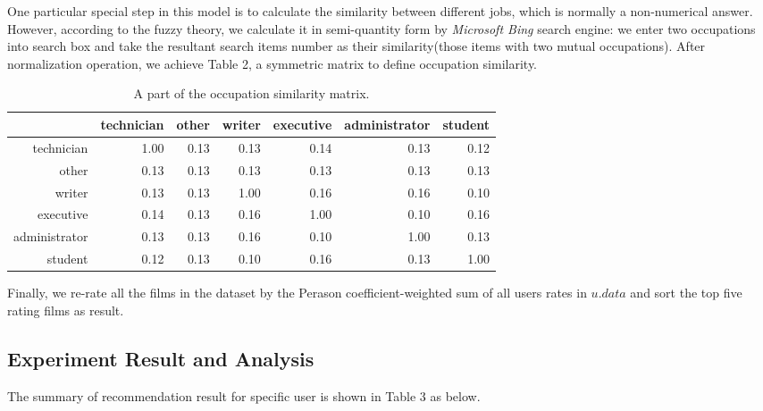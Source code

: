One particular special step in this model is to calculate the similarity between different jobs, which is normally a non-numerical answer. However, according to the fuzzy theory, we calculate it in semi-quantity form by \textit{Microsoft Bing} search engine: we enter two occupations into search box and take the resultant search items number as their similarity(those items with two mutual occupations). After normalization operation, we achieve Table 2, a symmetric matrix to define occupation similarity.

\begin{longtable}{|r|r|r|r|r|r|r|}
\caption{A part of the occupation similarity matrix.}\\
\hline
           & technician &   other &  writer &  executive & administrator &  student \\
\hline
technician &      1.00  &   0.13  &    0.13  &    0.14  &    0.13  &    0.12  \\
\hline
     other &      0.13  &   0.13  &    0.13  &    0.13  &    0.13  &    0.13  \\
\hline
    writer &      0.13  &   0.13  &    1.00  &    0.16  &    0.16  &    0.10  \\
\hline
 executive &      0.14  &   0.13  &    0.16  &    1.00  &    0.10  &    0.16  \\
\hline
administrator &   0.13  &   0.13  &   0.16  &     0.10  &    1.00  &    0.13  \\
\hline
   student &      0.12  &   0.13  &   0.10  &     0.16  &    0.13  &    1.00  \\
\hline
\end{longtable}  
Finally, we re-rate all the films in the dataset by the Perason coefficient-weighted sum of all users rates in $u.data$ and sort the top five rating films as result.

\subsection{Experiment Result and Analysis}
The summary of recommendation result for specific user is shown in Table 3 as below.


